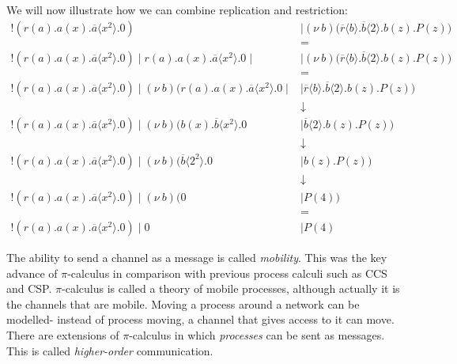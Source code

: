 \documentclass[a4paper, openany]{memoir}
\theoremstyle{definition}
\begin{document}
    We will now illustrate how we can combine replication and restriction:
    \begin{align*}
        !(r(a).a(x).\overline{a} \langle x^2 \rangle.0) &\mid (\nu \ b) \textbf{(} \overline{r} \langle b \rangle.\overline{b} \langle 2 \rangle.b(z).P(z) \textbf{)} \\
        &= \\
        !(r(a).a(x).\overline{a} \langle x^2 \rangle.0) \mid r(a).a(x).\overline{a} \langle x^2 \rangle.0 \mid &\mid (\nu \ b) \textbf{(} \overline{r} \langle b \rangle.\overline{b} \langle 2 \rangle.b(z).P(z) \textbf{)} \\
        &= \\
        !(r(a).a(x).\overline{a} \langle x^2 \rangle.0) \mid (\nu \ b) \textbf{(} r(a).a(x).\overline{a} \langle x^2 \rangle.0 \mid &\mid \overline{r} \langle b \rangle.\overline{b} \langle 2 \rangle.b(z).P(z) \textbf{)} \\
        &\downarrow \\
        !(r(a).a(x).\overline{a} \langle x^2 \rangle.0) \mid (\nu \ b) \textbf{(} b(x).\overline{b} \langle x^2 \rangle.0 &\mid \overline{b} \langle 2 \rangle.b(z).P(z) \textbf{)} \\
        &\downarrow \\
        !(r(a).a(x).\overline{a} \langle x^2 \rangle.0) \mid (\nu \ b) \textbf{(} \overline{b} \langle 2^2 \rangle.0 &\mid b(z).P(z) \textbf{)} \\
        &\downarrow \\
        !(r(a).a(x).\overline{a} \langle x^2 \rangle.0) \mid (\nu \ b) \textbf{(} 0 &\mid P(4) \textbf{)} \\
        &= \\
        !(r(a).a(x).\overline{a} \langle x^2 \rangle.0) \mid 0 &\mid P(4) 
    \end{align*}

    The ability to send a channel as a message is called \emph{mobility}. This was the key advance of $\pi$-calculus in comparison with previous process calculi such as CCS and CSP. $\pi$-calculus is called a theory of mobile processes, although actually it is the channels that are mobile. Moving a process around a network can be modelled- instead of process moving, a channel that gives access to it can move. There are extensions of $\pi$-calculus in which \emph{processes} can be sent as messages. This is called \emph{higher-order} communication.
\end{document}

